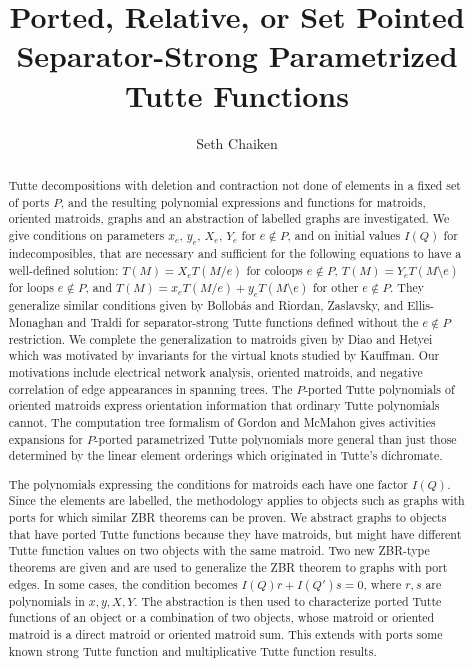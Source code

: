 \documentclass[12pt,leqno]{amsart}
\theoremstyle{remark}
\begin{document}
\title[Ported Separator-Strong Parametrized Tutte Functions]
{Ported, Relative, or Set Pointed Separator-Strong 
Parametrized Tutte Functions}

\author{Seth Chaiken}
\address{Computer Science Department\\
The University at Albany (SUNY)\\
Albany, NY 12222, U.S.A.}



\begin{abstract}
Tutte decompositions with deletion and contraction not done of elements
in a fixed set of ports $P$, and the 
resulting polynomial expressions and functions
for matroids, oriented matroids, graphs and an abstraction of
labelled graphs are investigated.
We give conditions on parameters $x_e$, $y_e$, $X_e$, $Y_e$ for $e\not\in P$,
and on initial values $I(Q)$ for indecomposibles, that are necessary and 
sufficient for the following equations to have a well-defined solution:
$T(M)=X_e T(M/e)$ for coloops $e\not\in P$, 
$T(M)=Y_e T(M\setminus e)$ for loops $e\not\in P$, and
$T(M)=x_e T(M/e) + y_e T(M\setminus e)$ for other $e\not\in P$.   They
generalize similar conditions given by Bollob\'{a}s and Riordan, Zaslavsky,
and Ellis-Monaghan and Traldi for separator-strong
Tutte functions defined without the
$e\not\in P$ restriction.  We complete the generalization to matroids
given by Diao and Hetyei which was motivated
by invariants for the virtual knots studied by Kauffman.  
Our motivations include electrical network analysis, oriented matroids,
and negative correlation of edge appearances in spanning trees. The $P$-ported
Tutte polynomials of oriented matroids express orientation information
that ordinary Tutte polynomials cannot.
The computation tree formalism of Gordon and McMahon gives
activities expansions for $P$-ported parametrized Tutte polynomials
more general than just
those determined by the linear element orderings
which originated in Tutte's dichromate.

The polynomials expressing the conditions for matroids
each have one factor $I(Q)$.  Since the elements are 
labelled, the methodology applies
to objects such as graphs with ports
for which similar ZBR theorems can be proven.  
We abstract graphs to objects that have 
ported Tutte functions
because they have matroids, but might
have different Tutte function values
on two objects with the same matroid.
Two new ZBR-type theorems are given
and are used to generalize the ZBR
theorem to graphs with port edges.
In some cases, the condition becomes
$I(Q)r+I(Q')s=0$, where $r,s$ are 
polynomials in $x,y,X,Y$.
The abstraction is then used to
characterize ported Tutte functions
of an object or a combination of two
objects, whose matroid or oriented 
matroid is a direct matroid or
oriented matroid sum.  
This extends with ports some 
known strong Tutte 
function and multiplicative 
Tutte function results.
\end{abstract}
\end{document}
